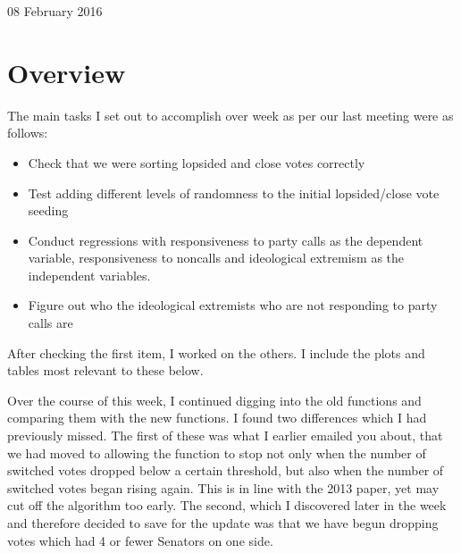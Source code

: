 \documentclass[12pt]{article}
\begin{document}
\begin{center}
\Large 08 February 2016
\end{center}

\section{Overview}

The main tasks I set out to accomplish over week as per our last meeting were as follows:

\begin{itemize}
	\item Check that we were sorting lopsided and close votes correctly
	
	\item Test adding different levels of randomness to the initial lopsided/close vote seeding
	
	\item Conduct regressions with responsiveness to party calls as the dependent variable, responsiveness to noncalls and ideological extremism as the independent variables.
	
	\item Figure out who the ideological extremists who are not responding to party calls are
\end{itemize}

\noindent
After checking the first item, I worked on the others. I include the plots and tables most relevant to these below.

Over the course of this week, I continued digging into the old functions and comparing them with the new functions. I found two differences which I had previously missed. The first of these was what I earlier emailed you about, that we had moved to allowing the function to stop not only when the number of switched votes dropped below a certain threshold, but also when the number of switched votes began rising again. This is in line with the 2013 paper, yet may cut off the algorithm too early. The second, which I discovered later in the week and therefore decided to save for the update was that we have begun dropping votes which had 4 or fewer Senators on one side.
\end{document}
